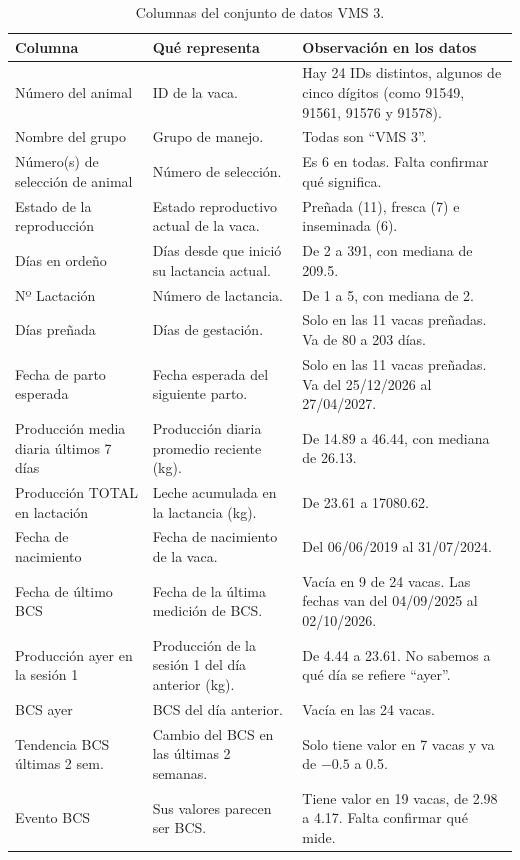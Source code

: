 \begin{table}[H]
  \centering
  \small
  \caption{Columnas del conjunto de datos VMS 3.}
  \label{tab:vms3}
  \begin{tabularx}{\textwidth}{>{\raggedright\arraybackslash}p{}>{\raggedright\arraybackslash}X>{\raggedright\arraybackslash}X}
    \toprule
    Columna & Qué representa & Observación en los datos \\
    \midrule
    Número del animal & ID de la vaca. & Hay 24 IDs distintos, algunos de cinco dígitos (como 91549, 91561, 91576 y 91578). \\
    \addlinespace
    Nombre del grupo & Grupo de manejo. & Todas son ``VMS 3''. \\
    \addlinespace
    Número(s) de selección de animal & Número de selección. & Es 6 en todas. Falta confirmar qué significa. \\
    \addlinespace
    Estado de la reproducción & Estado reproductivo actual de la vaca. & Preñada (11), fresca (7) e inseminada (6). \\
    \addlinespace
    Días en ordeño & Días desde que inició su lactancia actual. & De 2 a 391, con mediana de 209.5. \\
    \addlinespace
    Nº Lactación & Número de lactancia. & De 1 a 5, con mediana de 2. \\
    \addlinespace
    Días preñada & Días de gestación. & Solo en las 11 vacas preñadas. Va de 80 a 203 días. \\
    \addlinespace
    Fecha de parto esperada & Fecha esperada del siguiente parto. & Solo en las 11 vacas preñadas. Va del 25/12/2026 al 27/04/2027. \\
    \addlinespace
    Producción media diaria últimos 7 días & Producción diaria promedio reciente (kg). & De 14.89 a 46.44, con mediana de 26.13. \\
    \addlinespace
    Producción TOTAL en lactación & Leche acumulada en la lactancia (kg). & De 23.61 a 17080.62. \\
    \addlinespace
    Fecha de nacimiento & Fecha de nacimiento de la vaca. & Del 06/06/2019 al 31/07/2024. \\
    \addlinespace
    Fecha de último BCS & Fecha de la última medición de BCS. & Vacía en 9 de 24 vacas. Las fechas van del 04/09/2025 al 02/10/2026. \\
    \addlinespace
    Producción ayer en la sesión 1 & Producción de la sesión 1 del día anterior (kg). & De 4.44 a 23.61. No sabemos a qué día se refiere ``ayer''. \\
    \addlinespace
    BCS ayer & BCS del día anterior. & Vacía en las 24 vacas. \\
    \addlinespace
    Tendencia BCS últimas 2 sem. & Cambio del BCS en las últimas 2 semanas. & Solo tiene valor en 7 vacas y va de $-0.5$ a 0.5. \\
    \addlinespace
    Evento BCS & Sus valores parecen ser BCS. & Tiene valor en 19 vacas, de 2.98 a 4.17. Falta confirmar qué mide. \\
    \bottomrule
  \end{tabularx}
\end{table}

